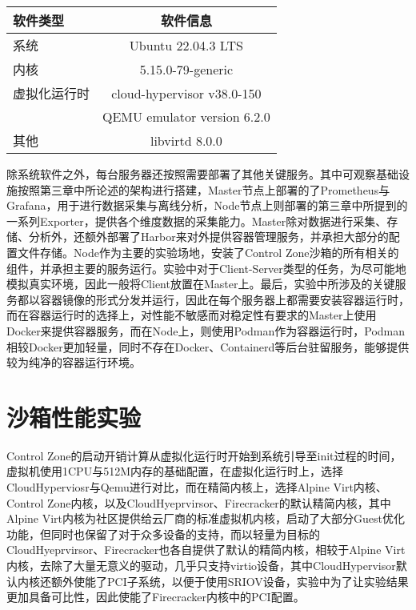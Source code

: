 \begin{table}
    \label{tab:system_env}
    \footnotesize%
    \setlength{\tabcolsep}{4pt}%
    \renewcommand{\arraystretch}{1.5}%
    \centering
    \begin{tabular}{lc}
        \hline
        软件类型 & 软件信息 \\
        \hline
        系统 & Ubuntu 22.04.3 LTS  \\
        内核 & 5.15.0-79-generic \\
        虚拟化运行时 & cloud-hypervisor v38.0-150 \\
                   & QEMU emulator version 6.2.0 \\
        其他        & libvirtd 8.0.0 \\
        \hline
    \end{tabular}
\end{table}

除系统软件之外，每台服务器还按照需要部署了其他关键服务。其中可观察基础设施按照第三章中所论述的架构进行搭建，Master节点上部署的了Prometheus与Grafana，用于进行数据采集与离线分析，Node节点上则部署的第三章中所提到的一系列Exporter，提供各个维度数据的采集能力。Master除对数据进行采集、存储、分析外，还额外部署了Harbor来对外提供容器管理服务，并承担大部分的配置文件存储。Node作为主要的实验场地，安装了Control Zone沙箱的所有相关的组件，并承担主要的服务运行。实验中对于Client-Server类型的任务，为尽可能地模拟真实环境，因此一般将Client放置在Master上。最后，实验中所涉及的关键服务都以容器镜像的形式分发并运行，因此在每个服务器上都需要安装容器运行时，而在容器运行时的选择上，对性能不敏感而对稳定性有要求的Master上使用Docker来提供容器服务，而在Node上，则使用Podman作为容器运行时，Podman相较Docker更加轻量，同时不存在Docker、Containerd等后台驻留服务，能够提供较为纯净的容器运行环境。

\section{沙箱性能实验}

Control Zone的启动开销计算从虚拟化运行时开始到系统引导至init过程的时间，虚拟机使用1CPU与512M内存的基础配置，在虚拟化运行时上，选择CloudHyperviosr与Qemu进行对比，而在精简内核上，选择Alpine Virt内核、Control Zone内核，以及CloudHyeprvirsor、Firecracker的默认精简内核，其中Alpine Virt内核为社区提供给云厂商的标准虚拟机内核，启动了大部分Guest优化功能，但同时也保留了对于众多设备的支持，而以轻量为目标的CloudHyeprvirsor、Firecracker也各自提供了默认的精简内核，相较于Alpine Virt内核，去除了大量无意义的驱动，几乎只支持virtio设备，其中CloudHypervisor默认内核还额外使能了PCI子系统，以便于使用SRIOV设备，实验中为了让实验结果更加具备可比性，因此使能了Firecracker内核中的PCI配置。


